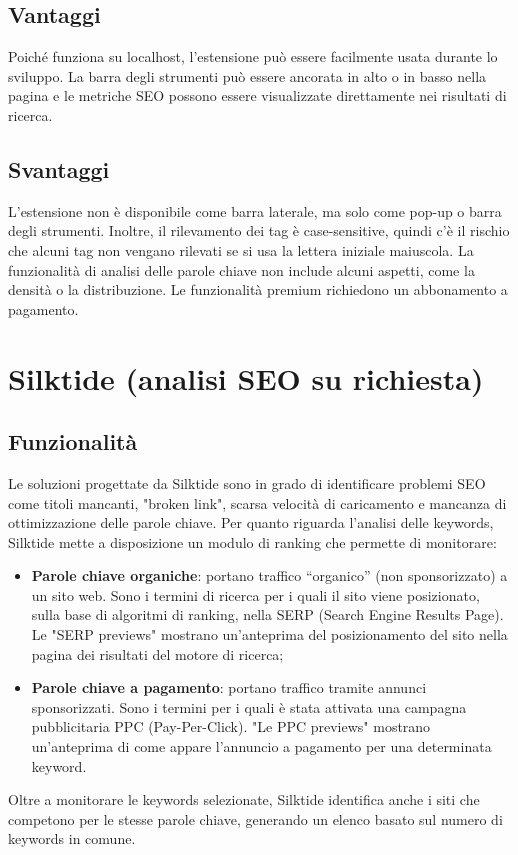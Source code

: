 \subsection{Vantaggi}
\par Poiché funziona su localhost, l’estensione può essere facilmente usata durante lo sviluppo. La barra degli strumenti può essere ancorata in alto o in basso nella pagina e le metriche SEO possono essere visualizzate direttamente nei risultati di ricerca.

\subsection{Svantaggi}
\par L’estensione non è disponibile come barra laterale, ma solo come pop-up o barra degli strumenti. Inoltre, il rilevamento dei tag è case-sensitive, quindi c’è il rischio che alcuni tag non vengano rilevati se si usa la lettera iniziale maiuscola. La funzionalità di analisi delle parole chiave non include alcuni aspetti, come la densità o la distribuzione. Le funzionalità premium richiedono un abbonamento a pagamento. 

\section{Silktide (analisi SEO su richiesta)}

\subsection{Funzionalità}
\par Le soluzioni progettate da Silktide sono in grado di identificare problemi SEO come titoli mancanti, "broken link", scarsa velocità di caricamento e mancanza di ottimizzazione delle parole chiave. Per quanto riguarda l’analisi delle keywords, Silktide mette a disposizione un modulo di ranking che permette di monitorare:
\begin{itemize}
    \item \textbf{Parole chiave organiche}: portano traffico “organico” (non sponsorizzato) a un sito web. Sono i termini di ricerca per i quali il sito viene posizionato, sulla base di algoritmi di ranking, nella SERP (Search Engine Results Page). Le "SERP previews" mostrano un'anteprima del posizionamento del sito nella pagina dei risultati del motore di ricerca;
    \item \textbf{Parole chiave a pagamento}: portano traffico tramite annunci sponsorizzati. Sono i termini per i quali è stata attivata una campagna pubblicitaria PPC (Pay-Per-Click). "Le PPC previews" mostrano un'anteprima di come appare l'annuncio a pagamento per una determinata keyword.
\end{itemize}
\par Oltre a monitorare le keywords selezionate, Silktide identifica anche i siti che competono per le stesse parole chiave, generando un elenco basato sul numero di keywords in comune.

